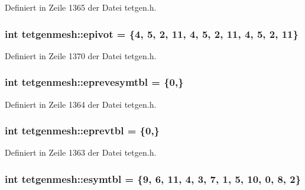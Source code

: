 Definiert in Zeile 1365 der Datei tetgen.\-h.

\hypertarget{classtetgenmesh_ab15ad8f91a8c322861e8a399b4199a08}{
\subsubsection[{epivot}]{\setlength{\rightskip}{0pt plus 5cm}int tetgenmesh\-::epivot = \{4, 5, 2, 11, 4, 5, 2, 11, 4, 5, 2, 11\}\hspace{0.3cm}{\ttfamily [static]}}}\label{classtetgenmesh_ab15ad8f91a8c322861e8a399b4199a08}


Definiert in Zeile 1370 der Datei tetgen.\-h.

\hypertarget{classtetgenmesh_aed59b6aa2586787f5bd0820d1ce41b4f}{
\subsubsection[{eprevesymtbl}]{\setlength{\rightskip}{0pt plus 5cm}int tetgenmesh\-::eprevesymtbl = \{0,\}\hspace{0.3cm}{\ttfamily [static]}}}\label{classtetgenmesh_aed59b6aa2586787f5bd0820d1ce41b4f}


Definiert in Zeile 1364 der Datei tetgen.\-h.

\hypertarget{classtetgenmesh_aaa63200d533d2d774680a0cb72475361}{
\subsubsection[{eprevtbl}]{\setlength{\rightskip}{0pt plus 5cm}int tetgenmesh\-::eprevtbl = \{0,\}\hspace{0.3cm}{\ttfamily [static]}}}\label{classtetgenmesh_aaa63200d533d2d774680a0cb72475361}


Definiert in Zeile 1363 der Datei tetgen.\-h.

\hypertarget{classtetgenmesh_ae23c95f112c7dcc119b8780b36d6c833}{
\subsubsection[{esymtbl}]{\setlength{\rightskip}{0pt plus 5cm}int tetgenmesh\-::esymtbl = \{9, 6, 11, 4, 3, 7, 1, 5, 10, 0, 8, 2\}\hspace{0.3cm}{\ttfamily [static]}}}\label{classtetgenmesh_ae23c95f112c7dcc119b8780b36d6c833}


